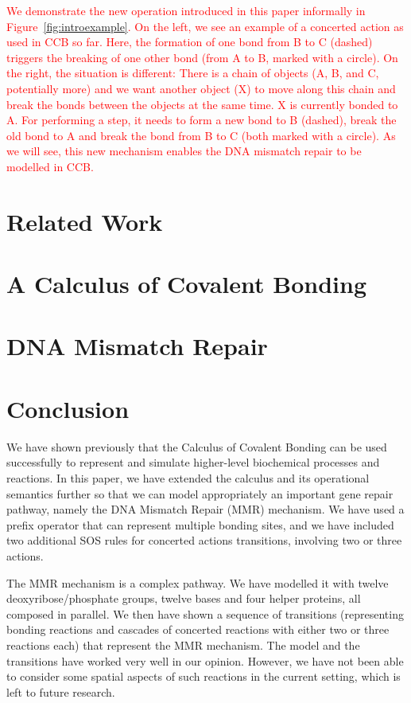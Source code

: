 \documentclass[review]{elsarticle}
\newcommand{\Red}[1]{\textcolor{red}{#1}}
\begin{document}
\Red{We demonstrate the new operation introduced in this paper informally in Figure~\ref{fig:introexample}. On the left, we see an example of a concerted action as used in CCB so far. Here, the formation of one bond from B to C (dashed) triggers the breaking of one other bond (from A to B, marked with a circle). On the right, the situation is different: There is a chain of objects (A, B, and C, potentially more) and we want another object (X) to move along this chain and break the bonds between the objects at the same time. X is currently bonded to A. For performing a step, it needs to form a new bond to B (dashed), break the old bond to A and break the bond from B to C (both marked with a circle). As we will see, this new mechanism enables the DNA mismatch repair to be modelled in CCB.}

\section{Related Work}

%
\section{A Calculus of Covalent Bonding}\label{sec:calculus}

%
%
%
\section{DNA Mismatch Repair}\label{sec:dnamimatch}

%
\section{Conclusion}
We have shown previously that the Calculus of Covalent Bonding can be used successfully to represent and simulate higher-level biochemical processes and reactions. In this paper, we have extended the calculus and its operational semantics further so that we can model appropriately an important gene repair pathway, namely the DNA Mismatch Repair (MMR) mechanism. We have used a prefix operator that can represent 
multiple bonding sites,  and we have included two additional SOS rules for concerted actions transitions, involving two or three actions. 

The MMR mechanism is a complex pathway. We have modelled it with twelve deoxyribose/phosphate groups, twelve bases and four helper proteins, all composed in parallel. We then have shown a sequence of transitions (representing bonding reactions and cascades of concerted reactions with either two or three reactions each) that represent the MMR mechanism. The model and the transitions have worked very well in our opinion. However, we have not been able to consider some spatial aspects of such reactions in the current setting, which is left to future research.


\end{document}
